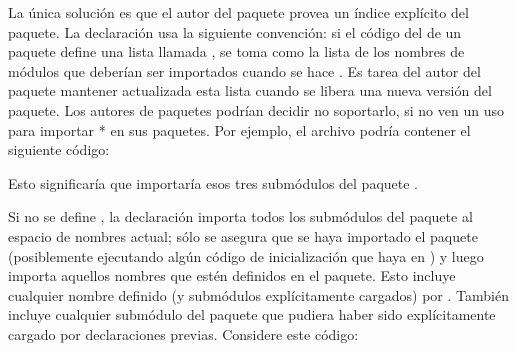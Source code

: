 \documentclass[a5paper,10pt,spanish]{sphinxmanual}
\begin{document}
\sphinxAtStartPar
La única solución es que el autor del paquete provea un índice explícito del paquete.  La declaración  usa la siguiente convención: si el código del  de un paquete define una lista llamada , se toma como la lista de los nombres de módulos que deberían ser importados cuando se hace .  Es tarea del autor del paquete mantener actualizada esta lista cuando se libera una nueva versión del paquete.  Los autores de paquetes podrían decidir no soportarlo, si no ven un uso para importar * en sus paquetes.  Por ejemplo, el archivo  podría contener el siguiente código:

\begin{sphinxVerbatim}[commandchars=\\\{\}]
  \PYG{p}{[}  \PYG{p}{]}
\end{sphinxVerbatim}

\sphinxAtStartPar
Esto significaría que  importaría esos tres submódulos del paquete .

\sphinxAtStartPar
Si no se define , la declaración   importa todos los submódulos del paquete  al espacio de nombres actual; sólo se asegura que se haya importado el paquete  (posiblemente ejecutando algún código de inicialización que haya en ) y luego importa aquellos nombres que estén definidos en el paquete.  Esto incluye cualquier nombre definido (y submódulos explícitamente cargados) por .  También incluye cualquier submódulo del paquete que pudiera haber sido explícitamente cargado por declaraciones  previas.  Considere este código:

\begin{sphinxVerbatim}[commandchars=\\\{\}]
 
 
   
\end{sphinxVerbatim}
\end{document}

